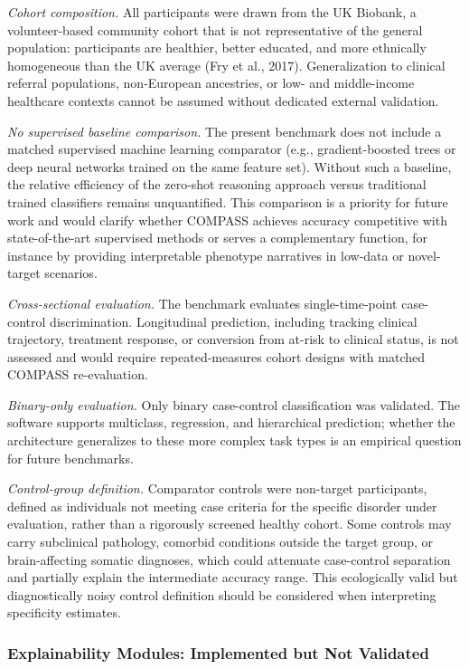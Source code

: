 \documentclass[11pt,a4paper,twoside]{article}
\begin{document}
\textit{Cohort composition.} All participants were drawn from the UK Biobank, a volunteer-based community cohort that is not representative of the general population: participants are healthier, better educated, and more ethnically homogeneous than the UK average (Fry et al., 2017). Generalization to clinical referral populations, non-European ancestries, or low- and middle-income healthcare contexts cannot be assumed without dedicated external validation.

\textit{No supervised baseline comparison.} The present benchmark does not include a matched supervised machine learning comparator (e.g., gradient-boosted trees or deep neural networks trained on the same feature set). Without such a baseline, the relative efficiency of the zero-shot reasoning approach versus traditional trained classifiers remains unquantified. This comparison is a priority for future work and would clarify whether COMPASS achieves accuracy competitive with state-of-the-art supervised methods or serves a complementary function, for instance by providing interpretable phenotype narratives in low-data or novel-target scenarios.

\textit{Cross-sectional evaluation.} The benchmark evaluates single-time-point case-control discrimination. Longitudinal prediction, including tracking clinical trajectory, treatment response, or conversion from at-risk to clinical status, is not assessed and would require repeated-measures cohort designs with matched COMPASS re-evaluation.

\textit{Binary-only evaluation.} Only binary case-control classification was validated. The software supports multiclass, regression, and hierarchical prediction; whether the architecture generalizes to these more complex task types is an empirical question for future benchmarks.

\textit{Control-group definition.} Comparator controls were non-target participants, defined as individuals not meeting case criteria for the specific disorder under evaluation, rather than a rigorously screened healthy cohort. Some controls may carry subclinical pathology, comorbid conditions outside the target group, or brain-affecting somatic diagnoses, which could attenuate case-control separation and partially explain the intermediate accuracy range. This ecologically valid but diagnostically noisy control definition should be considered when interpreting specificity estimates.

\subsubsection{Explainability Modules: Implemented but Not Validated}
\end{document}

